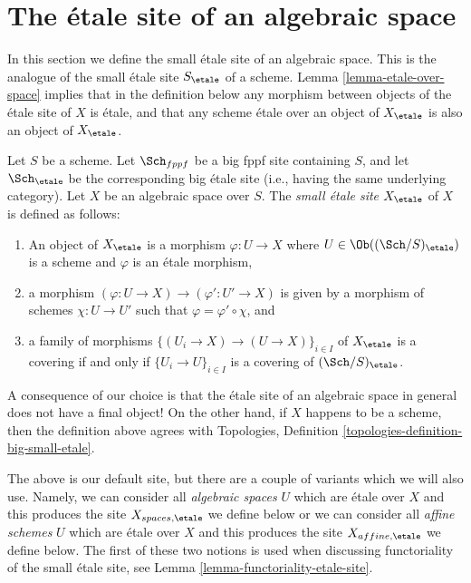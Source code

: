 








\section{The \'etale site of an algebraic space}
\label{section-etale-site}

\noindent
In this section we define the small \'etale site of an algebraic space.
This is the analogue of the small \'etale site $S_\etale$ of a scheme.
Lemma \ref{lemma-etale-over-space} implies that in the definition below
any morphism between objects of the \'etale site of $X$ is \'etale, and that
any scheme \'etale over an object of $X_\etale$ is also an object of
$X_\etale$.

\begin{definition}
\label{definition-etale-site}
Let $S$ be a scheme.
Let $\Sch_{fppf}$ be a big fppf site containing $S$,
and let $\Sch_\etale$ be the corresponding big \'etale site
(i.e., having the same underlying category).
Let $X$ be an algebraic space over $S$.
The {\it small \'etale site $X_\etale$} of $X$ is defined as follows:
\begin{enumerate}
\item An object of $X_\etale$ is a morphism $\varphi : U \to X$
where $U \in \Ob((\Sch/S)_\etale)$ is a scheme and
$\varphi$ is an \'etale morphism,
\item a morphism $(\varphi : U \to X) \to (\varphi' : U' \to X)$
is given by a morphism of schemes $\chi : U \to U'$ such that
$\varphi = \varphi' \circ \chi$, and
\item a family of morphisms $\{(U_i \to X) \to (U \to X)\}_{i \in I}$
of $X_\etale$ is a covering if and only if $\{U_i \to U\}_{i \in I}$
is a covering of $(\Sch/S)_\etale$.
\end{enumerate}
\end{definition}

\noindent
A consequence of our choice is that the \'etale site of an algebraic space
in general does not have a final object! On the other hand, if $X$ happens
to be a scheme, then the definition above agrees with
Topologies, Definition \ref{topologies-definition-big-small-etale}.

\medskip\noindent
The above is our default site, but there are a couple of variants
which we will also use. Namely, we can consider all {\it algebraic spaces}
$U$ which are \'etale over $X$ and this produces the site
$X_{spaces, \etale}$ we define below or we can consider all {\it affine schemes}
$U$ which are \'etale over $X$ and this produces the site
$X_{affine, \etale}$ we define below. The first of these two notions
is used when discussing functoriality of the small \'etale site, see
Lemma \ref{lemma-functoriality-etale-site}.

